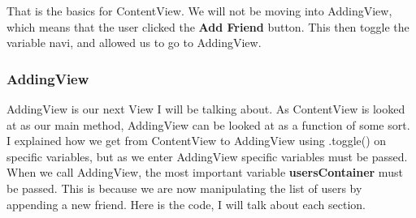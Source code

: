 \documentclass{article}
\theoremstyle{theorem}
\theoremstyle{definition}
\theoremstyle{remark}
\begin{document}
\noindent\newline That is the basics for ContentView. We will not be moving into AddingView, which means that the user clicked the \textbf{Add Friend} button. This then toggle the variable navi, and allowed us to go to AddingView.

\subsubsection{AddingView}

AddingView is our next View I will be talking about. As ContentView is looked at as our main method, AddingView can be looked at as a function of some sort. I explained how we get from ContentView to AddingView using .toggle() on specific variables, but as we enter AddingView specific variables must be passed. When we call AddingView, the most important variable \textbf{usersContainer} must be passed. This is because we are now manipulating the list of users by appending a new friend. Here is the code, I will talk about each section.
\end{document}
